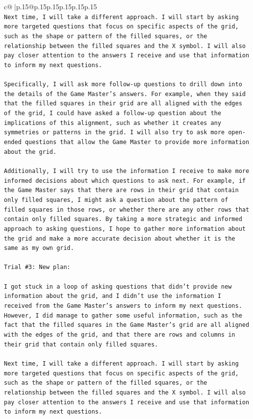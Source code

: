 \documentclass{article}
\begin{document}
{\begin{supertabular}{c@{$\;$}|p{.15\linewidth}@{}p{.15\linewidth}p{.15\linewidth}p{.15\linewidth}p{.15\linewidth}p{.15\linewidth}}
{{{\\ 
\texttt{Next time, I will take a different approach. I will start by asking more targeted questions that focus on specific aspects of the grid, such as the shape or pattern of the filled squares, or the relationship between the filled squares and the X symbol. I will also pay closer attention to the answers I receive and use that information to inform my next questions.} \\
\\ 
\texttt{Specifically, I will ask more follow{-}up questions to drill down into the details of the Game Master's answers. For example, when they said that the filled squares in their grid are all aligned with the edges of the grid, I could have asked a follow{-}up question about the implications of this alignment, such as whether it creates any symmetries or patterns in the grid. I will also try to ask more open{-}ended questions that allow the Game Master to provide more information about the grid.} \\
\\ 
\texttt{Additionally, I will try to use the information I receive to make more informed decisions about which questions to ask next. For example, if the Game Master says that there are rows in their grid that contain only filled squares, I might ask a question about the pattern of filled squares in those rows, or whether there are any other rows that contain only filled squares. By taking a more strategic and informed approach to asking questions, I hope to gather more information about the grid and make a more accurate decision about whether it is the same as my own grid.} \\
\\ 
\texttt{Trial \#3: New plan: } \\
\\ 
\texttt{I got stuck in a loop of asking questions that didn't provide new information about the grid, and I didn't use the information I received from the Game Master's answers to inform my next questions. However, I did manage to gather some useful information, such as the fact that the filled squares in the Game Master's grid are all aligned with the edges of the grid, and that there are rows and columns in their grid that contain only filled squares.} \\
\\ 
\texttt{Next time, I will take a different approach. I will start by asking more targeted questions that focus on specific aspects of the grid, such as the shape or pattern of the filled squares, or the relationship between the filled squares and the X symbol. I will also pay closer attention to the answers I receive and use that information to inform my next questions.} \\
}}}
\end{supertabular}}
\end{document}
